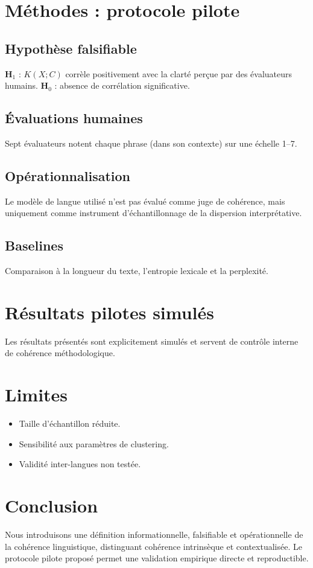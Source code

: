 \documentclass[11pt,a4paper]{article}
\begin{document}
\section{Méthodes : protocole pilote}
\subsection{Hypothèse falsifiable}
\textbf{H$_1$} : $K(X;C)$ corrèle positivement avec la clarté perçue par des évaluateurs humains.
\textbf{H$_0$} : absence de corrélation significative.

\subsection{Évaluations humaines}
Sept évaluateurs notent chaque phrase (dans son contexte) sur une échelle 1--7.

\subsection{Opérationnalisation}
Le modèle de langue utilisé n’est pas évalué comme juge de cohérence, mais uniquement comme instrument d’échantillonnage de la dispersion interprétative.

\subsection{Baselines}
Comparaison à la longueur du texte, l’entropie lexicale et la perplexité.

\section{Résultats pilotes simulés}
Les résultats présentés sont explicitement simulés et servent de contrôle interne de cohérence méthodologique.

\section{Limites}
\begin{itemize}
\item Taille d’échantillon réduite.
\item Sensibilité aux paramètres de clustering.
\item Validité inter-langues non testée.
\end{itemize}

\section{Conclusion}
Nous introduisons une définition informationnelle, falsifiable et opérationnelle de la cohérence linguistique, distinguant cohérence intrinsèque et contextualisée. Le protocole pilote proposé permet une validation empirique directe et reproductible.
\end{document}
